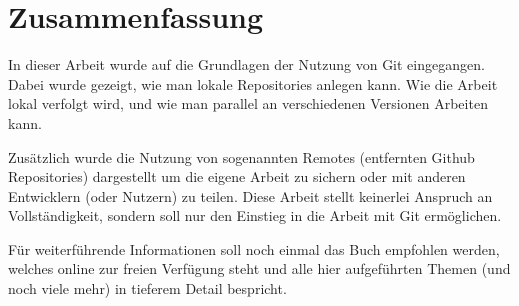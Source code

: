 \section{Zusammenfassung}
In dieser Arbeit wurde auf die Grundlagen der Nutzung von Git eingegangen. Dabei wurde gezeigt, wie man lokale Repositories anlegen kann. Wie die Arbeit lokal verfolgt wird, und wie man parallel an verschiedenen Versionen Arbeiten kann.

Zusätzlich wurde die Nutzung von sogenannten Remotes (entfernten Github Repositories) dargestellt um die eigene Arbeit zu sichern oder mit anderen Entwicklern (oder Nutzern) zu teilen. Diese Arbeit stellt keinerlei Anspruch an Vollständigkeit, sondern soll nur den Einstieg in die Arbeit mit Git ermöglichen.

Für weiterführende Informationen soll noch einmal das Buch \cite{ProGit} empfohlen werden, welches online zur freien Verfügung steht und alle hier aufgeführten Themen (und noch viele mehr) in tieferem Detail bespricht.